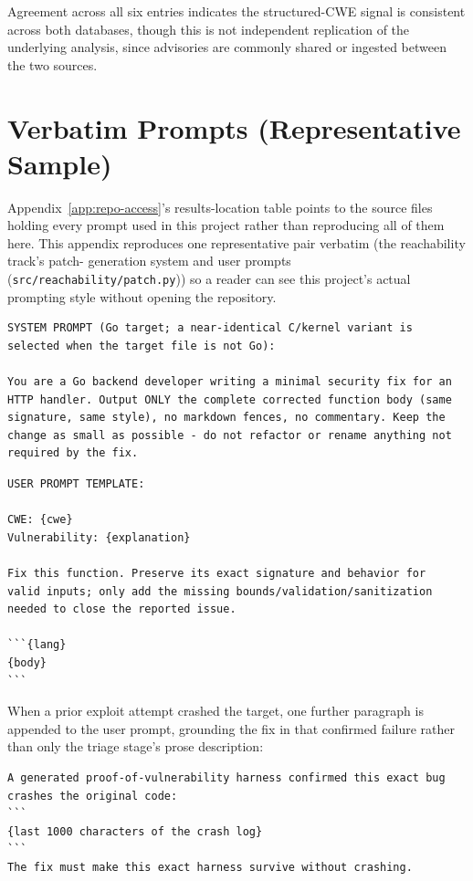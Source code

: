 \documentclass[12pt,a4paper]{report}
\begin{document}
Agreement across all six entries indicates the structured-CWE signal is consistent across both databases, though this is not independent replication of the underlying analysis, since advisories are commonly shared or ingested between the two sources.

\chapter{Verbatim Prompts (Representative Sample)}
\label{app:verbatim-prompts}

Appendix~\ref{app:repo-access}'s results-location table points to the
source files holding every prompt used in this project rather than
reproducing all of them here. This appendix reproduces one
representative pair verbatim (the reachability track's patch-
generation system and user prompts (\texttt{src/reachability/patch.py})) so a reader can see this project's actual prompting style without
opening the repository.

\begin{verbatim}
SYSTEM PROMPT (Go target; a near-identical C/kernel variant is
selected when the target file is not Go):

You are a Go backend developer writing a minimal security fix for an
HTTP handler. Output ONLY the complete corrected function body (same
signature, same style), no markdown fences, no commentary. Keep the
change as small as possible - do not refactor or rename anything not
required by the fix.
\end{verbatim}

\begin{verbatim}
USER PROMPT TEMPLATE:

CWE: {cwe}
Vulnerability: {explanation}

Fix this function. Preserve its exact signature and behavior for
valid inputs; only add the missing bounds/validation/sanitization
needed to close the reported issue.

```{lang}
{body}
```
\end{verbatim}

When a prior exploit attempt crashed the target, one further
paragraph is appended to the user prompt, grounding the fix in that
confirmed failure rather than only the triage stage's prose
description:

\begin{verbatim}
A generated proof-of-vulnerability harness confirmed this exact bug
crashes the original code:
```
{last 1000 characters of the crash log}
```
The fix must make this exact harness survive without crashing.
\end{verbatim}
\end{document}
